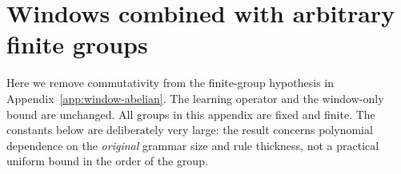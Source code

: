 \section{Windows combined with arbitrary finite groups}
\label{app:window-group}

Here we remove commutativity from the finite-group hypothesis in
Appendix~\ref{app:window-abelian}.  The learning operator and the
window-only bound are unchanged.  All groups in this appendix are
fixed and finite.  The constants below are deliberately very large:
the result concerns polynomial dependence on the \emph{original}
grammar size and rule thickness, not a practical uniform bound in
the order of the group.

